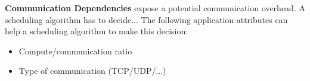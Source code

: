 \textbf{Communication Dependencies} expose a potential communication overhead. A scheduling algorithm has to decide... The following application attributes can help a scheduling algorithm to make this decision:

\begin{itemize}
\item Compute/communication ratio
\item Type of communication (TCP/UDP/...) 
\end{itemize}
